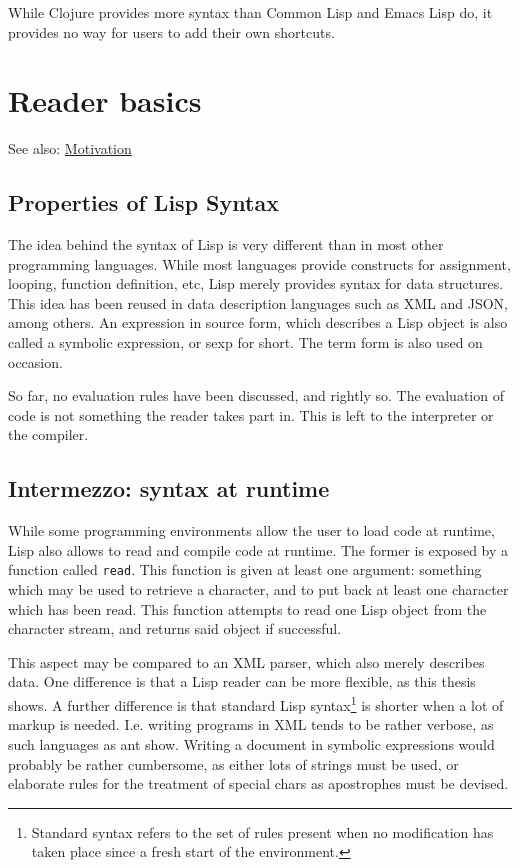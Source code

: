 \documentclass[a4paper]{article}
\begin{document}
While Clojure provides more syntax than Common Lisp and Emacs Lisp do, it provides no
way for users to add their own shortcuts.

\section{Reader basics}
\label{sec:orgheadline17}
See also: \hyperref[sec:orgheadline8]{Motivation}
\subsection{Properties of Lisp Syntax}
\label{sec:orgheadline9}
The idea behind the syntax of Lisp is very different than in most other
programming languages.  While most languages provide constructs for assignment,
looping, function definition, etc, Lisp merely provides syntax for data
structures.  This idea has been reused in data description languages such as XML
and JSON, among others.  An expression in source form, which describes a Lisp
object is also called a symbolic expression, or sexp for short.  The term form
is also used on occasion.

So far, no evaluation rules have been discussed, and rightly so.  The evaluation
of code is not something the reader takes part in.  This is left to the
interpreter or the compiler.

\subsection{Intermezzo: syntax at runtime}
\label{sec:orgheadline10}
While some programming environments allow the user to load code at runtime, Lisp
also allows to read and compile code at runtime.  The former is exposed by a
function called \texttt{read}.  This function is given at least one argument:
something which may be used to retrieve a character, and to put back at least
one character which has been read.  This function attempts to read one Lisp
object from the character stream, and returns said object if successful.

This aspect may be compared to an XML parser, which also merely describes data.
One difference is that a Lisp reader can be more flexible, as this thesis shows.
A further difference is that standard Lisp syntax\footnote{Standard syntax refers to
the set of rules present when no modification has taken place since a fresh
start of the environment.} is shorter when a lot of markup is needed.
I.e. writing programs in XML tends to be rather verbose, as such languages as ant
 show.  Writing a document in symbolic expressions
would probably be rather cumbersome, as either lots of strings must be used, or
elaborate rules for the treatment of special chars as apostrophes must be devised.
\end{document}
